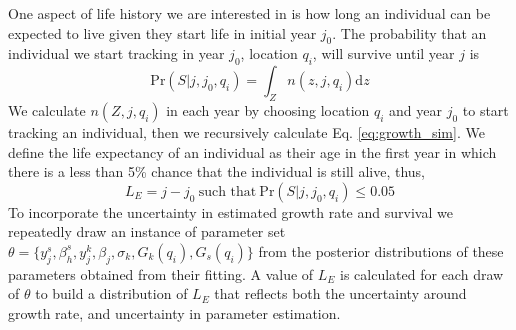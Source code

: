 \documentclass[12pt,a4paper]{article}
\begin{document}
One aspect of life history we are interested in is how long an individual can be expected to live given they start life in initial year $j_0$. The probability that an individual we start tracking in year $j_0$, location $q_i$, will survive until year $j$ is
\begin{equation}\label{eq:sur_j}
	\text{Pr}(S|j, j_0, q_i) = \int_Z n(z, j, q_i)\text{d}z
\end{equation}
We calculate $n(Z, j, q_i)$ in each year by choosing location $q_i$ and year $j_0$ to start tracking an individual, then we recursively calculate Eq. \ref{eq:growth_sim}. We define the life expectancy of an individual as their age in the first year in which there is a less than 5\% chance that the individual is still alive, thus, 
\begin{equation}
	L_E = j - j_0~\text{such that}~\text{Pr}(S|j, j_0, q_i) \leq 0.05 
\end{equation} 
To incorporate the uncertainty in estimated growth rate and survival we repeatedly draw an instance of parameter set $\theta = \{y_j^s, \beta_h^s, y_j^k, \beta_j, \sigma_k, G_k(q_i), G_s(q_i) \}$ from the posterior distributions of these parameters obtained from their fitting. A value of $L_E$ is calculated for each draw of $\theta$ to build a distribution of $L_E$ that reflects both the uncertainty around growth rate, and uncertainty in parameter estimation.
\end{document}

